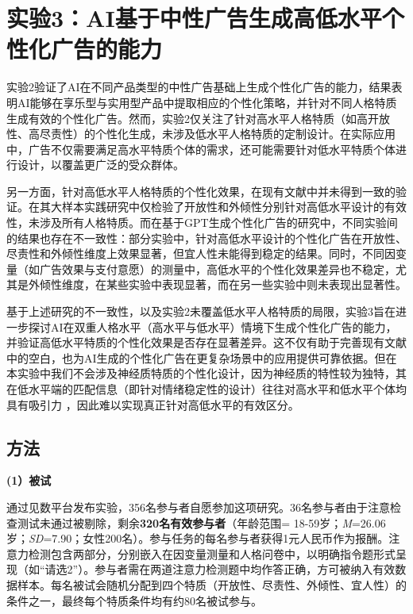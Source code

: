 \section{实验3：AI基于中性广告生成高低水平个性化广告的能力}

实验2验证了AI在不同产品类型的中性广告基础上生成个性化广告的能力，结果表明AI能够在享乐型与实用型产品中提取相应的个性化策略，并针对不同人格特质生成有效的个性化广告。然而，实验2仅关注了针对高水平人格特质（如高开放性、高尽责性）的个性化生成，未涉及低水平人格特质的定制设计。在实际应用中，广告不仅需要满足高水平特质个体的需求，还可能需要针对低水平特质个体进行设计，以覆盖更广泛的受众群体。

另一方面，针对高低水平人格特质的个性化效果，在现有文献中并未得到一致的验证。\citet{matz2017psychological}在其大样本实践研究中仅检验了开放性和外倾性分别针对高低水平设计的有效性，未涉及所有人格特质。而在\citet{matz2024potential}基于GPT生成个性化广告的研究中，不同实验间的结果也存在不一致性：部分实验中，针对高低水平设计的个性化广告在开放性、尽责性和外倾性维度上效果显著，但宜人性未能得到稳定的结果。同时，不同因变量（如广告效果与支付意愿）的测量中，高低水平的个性化效果差异也不稳定，尤其是外倾性维度，在某些实验中表现显著，而在另一些实验中则未表现出显著性。

基于上述研究的不一致性，以及实验2未覆盖低水平人格特质的局限，实验3旨在进一步探讨AI在双重人格水平（高水平与低水平）情境下生成个性化广告的能力，并验证高低水平特质的个性化效果是否存在显著差异。这不仅有助于完善现有文献中的空白，也为AI生成的个性化广告在更复杂场景中的应用提供可靠依据。但在本实验中我们不会涉及神经质特质的个性化设计，因为神经质的特性较为独特，其在低水平端的匹配信息（即针对情绪稳定性的设计）往往对高水平和低水平个体均具有吸引力 \citep{matz2016personality}，因此难以实现真正针对高低水平的有效区分。


\subsection{方法}


\textbf{(1）被试}

通过见数平台发布实验，356名参与者自愿参加这项研究。36名参与者由于注意检查测试未通过被剔除，剩余\textbf{320名有效参与者}（年龄范围= 18-59岁；\textit{M}=26.06岁；\textit{SD}=7.90；女性200名）。参与任务的每名参与者获得1元人民币作为报酬。注意力检测包含两部分，分别嵌入在因变量测量和人格问卷中，以明确指令题形式呈现（如“请选2”）。参与者需在两道注意力检测题中均作答正确，方可被纳入有效数据样本。每名被试会随机分配到四个特质（开放性、尽责性、外倾性、宜人性）的条件之一，最终每个特质条件均有约80名被试参与。


